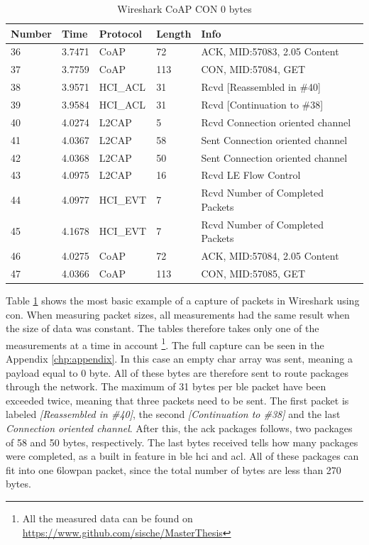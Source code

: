 \begin{table}[ht]
\centering
\caption{Wireshark CoAP CON 0 bytes}
\label{coapCON0table}
\begin{tabular}{lllll}
Number & Time   & Protocol & Length & Info                             \\ \hline
36     & 3.7471 & CoAP     & 72     & ACK, MID:57083, 2.05 Content     \\
37     & 3.7759 & CoAP     & 113    & CON, MID:57084, GET              \\
38     & 3.9571 & HCI\_ACL & 31     & Rcvd {[}Reassembled in \#40{]}   \\
39     & 3.9584 & HCI\_ACL & 31     & Rcvd {[}Continuation to \#38{]}  \\
40     & 4.0274 & L2CAP    & 5      & Rcvd Connection oriented channel \\
41     & 4.0367 & L2CAP    & 58     & Sent Connection oriented channel \\
42     & 4.0368 & L2CAP    & 50     & Sent Connection oriented channel \\
43     & 4.0975 & L2CAP    & 16     & Rcvd LE Flow Control             \\
44     & 4.0977 & HCI\_EVT & 7      & Rcvd Number of Completed Packets \\
45     & 4.1678 & HCI\_EVT & 7      & Rcvd Number of Completed Packets \\
46     & 4.0275 & CoAP     & 72     & ACK, MID:57084, 2.05 Content     \\
47     & 4.0366 & CoAP     & 113    & CON, MID:57085, GET              \\ \hline
\end{tabular}
\end{table}

\noindent Table \ref{coapCON0table} shows the most basic example of a capture of packets in Wireshark using \gls{con}. When measuring packet sizes, all measurements had the same result when the size of data was constant. The tables therefore takes only one of the measurements at a time in account \footnote{All the measured data can be found on \url{https://www.github.com/sische/MasterThesis}}. The full capture can be seen in the Appendix \ref{chp:appendix}. In this case an empty char array was sent, meaning a \gls{payload} equal to 0 byte. All of these bytes are therefore sent to route packages through the network. The maximum of 31 bytes per \gls{ble} packet have been exceeded twice, meaning that three packets need to be sent. The first packet is labeled \textit{[Reassembled in \#40]}, the second \textit{[Continuation to \#38]} and the last \textit{Connection oriented channel}. After this, the \gls{ack} packages follows, two packages of 58 and 50 bytes, respectively. The last bytes received tells how many packages were completed, as a built in feature in \gls{ble}  \gls{hci}  and \gls{acl}. All of these packages can fit into one \gls{6lowpan} packet, since the total number of bytes are less than 270 bytes. 


